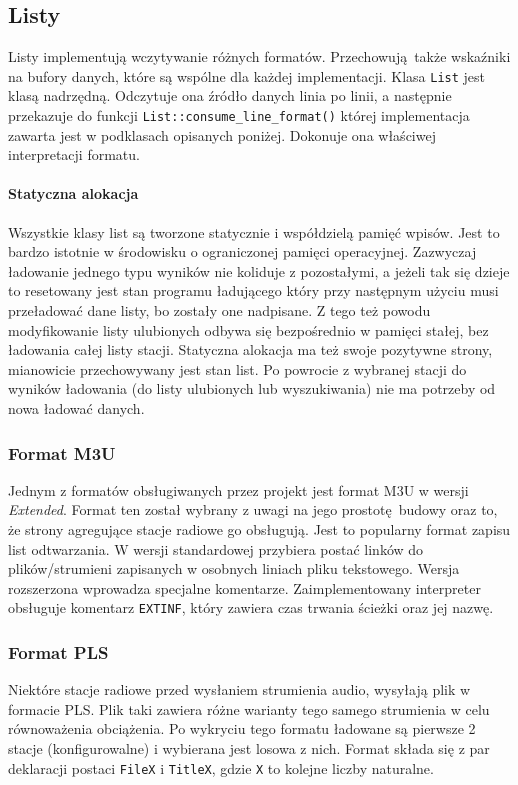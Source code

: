 \documentclass[12pt]{report}
\begin{document}
		\subsection{Listy}
			Listy implementują wczytywanie różnych formatów. Przechowują także wskaźniki na bufory danych, które są wspólne dla każdej implementacji. Klasa \lstinline|List| jest klasą nadrzędną. Odczytuje ona źródło danych linia po linii, a następnie przekazuje do funkcji \lstinline|List::consume_line_format()| której implementacja zawarta jest w podklasach opisanych poniżej. Dokonuje ona właściwej interpretacji formatu.
			
			\paragraph{Statyczna alokacja} Wszystkie klasy list są tworzone statycznie i współdzielą pamięć wpisów. Jest to bardzo istotnie w środowisku o ograniczonej pamięci operacyjnej. Zazwyczaj ładowanie jednego typu wyników nie koliduje z pozostałymi, a jeżeli tak się dzieje to resetowany jest stan programu ładującego który przy następnym użyciu musi przeładować dane listy, bo zostały one nadpisane. Z tego też powodu modyfikowanie listy ulubionych odbywa się bezpośrednio w pamięci stałej, bez ładowania całej listy stacji. Statyczna alokacja ma też swoje pozytywne strony, mianowicie przechowywany jest stan list. Po powrocie z wybranej stacji do wyników ładowania (do listy ulubionych lub wyszukiwania) nie ma potrzeby od nowa ładować danych.
			
			\subsubsection{Format M3U}
				Jednym z formatów obsługiwanych przez projekt jest format M3U\textsuperscript{\cite{m3u}} w wersji \textit{Extended}. Format ten został wybrany z uwagi na jego prostotę budowy oraz to, że strony agregujące stacje radiowe go obsługują. Jest to popularny format zapisu list odtwarzania. W wersji standardowej przybiera postać linków do plików/strumieni zapisanych w osobnych liniach pliku tekstowego. Wersja rozszerzona wprowadza specjalne komentarze. Zaimplementowany interpreter obsługuje komentarz \lstinline|EXTINF|, który zawiera czas trwania ścieżki oraz jej nazwę.
			
			\subsubsection{Format PLS}
				Niektóre stacje radiowe przed wysłaniem strumienia audio, wysyłają plik w formacie PLS\textsuperscript{\cite{pls}}. Plik taki zawiera różne warianty tego samego strumienia w celu równoważenia obciążenia. Po wykryciu tego formatu ładowane są pierwsze 2 stacje (konfigurowalne) i wybierana jest losowa z nich. Format składa się z par deklaracji postaci \lstinline|FileX| i \lstinline|TitleX|, gdzie \lstinline|X| to kolejne liczby naturalne.
			
\end{document}
